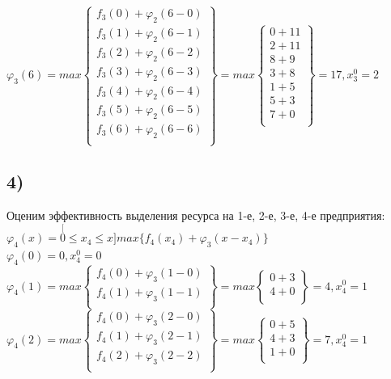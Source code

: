 $\varphi_3(6) = max \begin{Bmatrix}
    f_3(0) + \varphi_2(6 - 0) \\
    f_3(1) + \varphi_2(6 - 1) \\
    f_3(2) + \varphi_2(6 - 2) \\
    f_3(3) + \varphi_2(6 - 3) \\
    f_3(4) + \varphi_2(6 - 4) \\
    f_3(5) + \varphi_2(6 - 5) \\
    f_3(6) + \varphi_2(6 - 6) \\
\end{Bmatrix} = max \begin{Bmatrix}
    0 + 11 \\
    2 + 11 \\
    8 + 9 \\
    3 + 8 \\
    1 + 5 \\
    5 + 3 \\
    7 + 0 \\
\end{Bmatrix} = 17, x_3^0 = 2$\\


\subsection*{4)} Оценим эффективность выделения ресурса на 1-е, 2-е, 3-е, 4-е предприятия:\\
$\varphi_4(x) = \stackrel[0 \le x_4 \le x]{}{max}  \{f_4(x_4) + \varphi_3(x - x_4)\}$\\

$\varphi_4(0) = 0, x_4^0 = 0$\\

$\varphi_4(1) = max \begin{Bmatrix}
    f_4(0) + \varphi_3(1 - 0) \\
    f_4(1) + \varphi_3(1 - 1) \\
\end{Bmatrix} = max \begin{Bmatrix}
    0 + 3 \\
    4 + 0 \\
\end{Bmatrix} = 4, x_4^0 = 1$\\

$\varphi_4(2) = max \begin{Bmatrix}
    f_4(0) + \varphi_3(2 - 0) \\
    f_4(1) + \varphi_3(2 - 1) \\
    f_4(2) + \varphi_3(2 - 2) \\
\end{Bmatrix} = max \begin{Bmatrix}
    0 + 5 \\
    4 + 3 \\
    1 + 0 \\
\end{Bmatrix} = 7, x_4^0 = 1$\\

